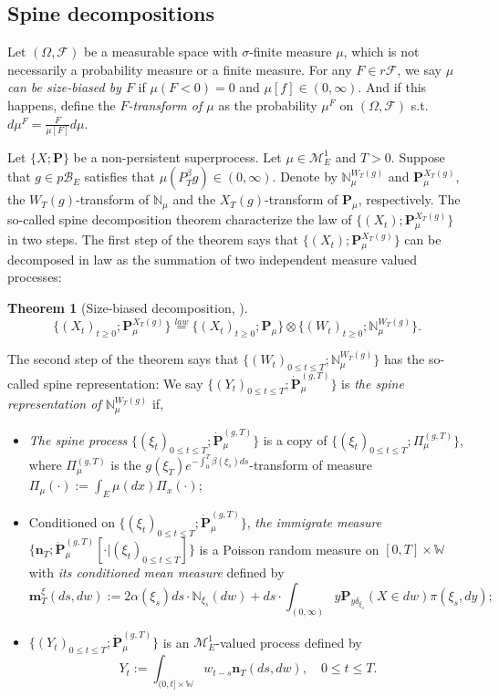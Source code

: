 \documentclass[12pt, a4paper]{amsart}
\newtheorem{thm}{Theorem}[section]
\theoremstyle{definition}
\numberwithin{equation}{section}
\begin{document}
\subsection{Spine decompositions}
\label{sec: Spine decompositions}
	Let $(\Omega, \mathscr F)$ be a measurable space with $\sigma$-finite measure $\mu$, which is not necessarily a probability measure or a finite measure.
	For any $F\in r\mathscr F$, we say \emph{$\mu$ can be size-biased by $F$} if $\mu(F< 0) = 0$ and $\mu [f] \in (0,\infty)$. 
	And if this happens, define the \emph{$F$-transform of $\mu$} as the probability $\mu^F$ on $(\Omega, \mathscr F)$ s.t. $d\mu^F= \frac{F}{\mu[F]}d \mu$.

	Let $\{X;\mathbf P\}$ be a non-persistent superprocess.
	Let $\mu \in \mathcal M^1_E$ and $T>0$. 
	Suppose that $g\in p\mathscr B_E$ satisfies that $\mu(P^\beta_Tg) \in (0,\infty)$.
	Denote by $\mathbb N^{W_T(g)}_\mu$ and $\mathbf P_\mu^{X_T(g)}$, the $W_T(g)$-transform of $\mathbb N_\mu$ and the $X_T(g)$-transform of $\mathbf P_\mu$, respectively.
	The so-called spine decomposition theorem characterize the law of $\{(X_t); \mathbf P_\mu^{X_T(g)}\}$ in two steps.
	The first step of the theorem says that $\{(X_t); \mathbf P_\mu^{X_T(g)}\}$ can be decomposed in law as the summation of two independent measure valued processes:
	
\begin{thm}[Size-biased decomposition, \cite{RenSongSun2017Spine}]\label{thm: size-biased decomposition}
\[
	\{(X_t)_{t\geq 0}; \mathbf P_\mu^{X_T(g)}\}
	\overset{law}{=} \{(X_t)_{t\geq 0}; \mathbf P_\mu \} \otimes \{(W_t)_{t\geq 0}; \mathbb N^{W_T(g)}_\mu\}.
\]
\end{thm}
	The second step of the theorem says that $\{(W_t)_{0\leq t\leq T}; \mathbb N^{W_T(g)}_\mu\}$ has the so-called spine representation:
	We say $\{(Y_t)_{ 0\leq t\leq T}; \dot {\mathbf P}^{(g,T)}_\mu\}$ is \emph{the spine representation of $\mathbb N^{W_T(g)}_\mu$}  if,
\begin{itemize}
\item
	\emph{The spine process} $\{(\xi_t)_{0\leq t\leq T}; \dot{\mathbf P}^{(g,T)}_\mu\}$ is a copy of $\{(\xi_t)_{0\leq t\leq T}; \Pi^{(g,T)}_{\mu}\}$, where $\Pi^{(g,T)}_{\mu}$ is the $g(\xi_T) e^{-\int_0^T \beta(\xi_s)ds}$-transform of measure $\Pi_{\mu}(\cdot):=\int_{E}\mu(dx)\Pi_x(\cdot) $;
\item
	Conditioned on $\{(\xi_t)_{0\leq t\leq T}; \dot{\mathbf P}^{(g,T)}_\mu\}$, \emph{the immigrate measure} $\{\mathbf n_T; \dot{\mathbf P}^{(g,T)}_\mu[\cdot |(\xi_t)_{0\leq t\leq T}]\}$ is a Poisson random measure on $[0,T] \times \mathbb W$ with \emph{its conditioned mean measure} defined by
\[
	\mathbf m^\xi_T(ds,dw)
	:= 2 \alpha(\xi_s) ds \cdot \mathbb N_{\xi_s}(dw) + ds \cdot \int_{(0,\infty)} y \mathbf P_{y\delta_{\xi_s}}(X\in dw) \pi(\xi_s,dy);
\]
\item
	$\{(Y_t)_{0\leq t\leq T}; \dot{\mathbf P}^{(g,T)}_\mu\}$ is an $\mathcal M^1_E$-valued process defined by
\[
	Y_t
	:= \int_{(0,t] \times \mathbb W} w_{t-s} \mathbf n_T(ds,dw),
	\quad 0 \leq t\leq T.
\]
\end{itemize}
\end{document}
